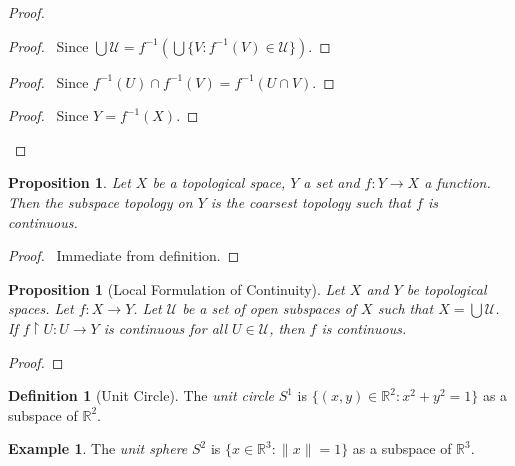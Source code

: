\documentclass{book}
\let\qed\relax
\newtheorem{prop}[ax]{Proposition}
\theoremstyle{definition}
\newtheorem{df}[ax]{Definition}
\newtheorem{ex}[ax]{Example}
\newcommand{\inv}[1]{\ensuremath{{#1}^{-1}}}
\begin{document}
\begin{proof}
\pf
{}
\begin{proof}
	\pf\ Since $\bigcup \mathcal{U} = \inv{f}(\bigcup \{ V : \inv{f}(V) \in \mathcal{U}\})$.
\end{proof}
\begin{proof}
	\pf\ Since $\inv{f}(U) \cap \inv{f}(V) = \inv{f}(U 
\cap V)$.
\end{proof}
\begin{proof}
	\pf\ Since $Y = \inv{f}(X)$.
\end{proof}
\qed
\end{proof}

\begin{prop}
Let $X$ be a topological space, $Y$ a set and $f : Y \rightarrow X$ a function. Then the subspace topology on $Y$ is the coarsest topology such that $f$ is continuous.
\end{prop}

\begin{proof}
\pf\ Immediate from definition. \qed
\end{proof}

\begin{prop}[Local Formulation of Continuity]
Let $X$ and $Y$ be topological spaces. Let $f : X \rightarrow Y$. Let $\mathcal{U}$ be a set of open subspaces of $X$ such that $X = \bigcup \mathcal{U}$. If $f \restriction U : U \rightarrow Y$ is continuous for all $U \in \mathcal{U}$, then $f$ is continuous.
\end{prop}

\begin{proof}
\pf
{}
\qed
\end{proof}

\begin{df}[Unit Circle]
The \emph{unit circle} $S^1$ is $\{ (x,y) \in \mathbb{R}^2 : x^2 + y^2 = 1 \}$ as a subspace of $\mathbb{R}^2$.
\end{df}

\begin{ex}
The \emph{unit sphere} $S^2$ is $\{ x \in \mathbb{R}^3 : \| x \| = 1 \}$ as a subspace of $\mathbb{R}^3$.
\end{ex}
\end{document}
